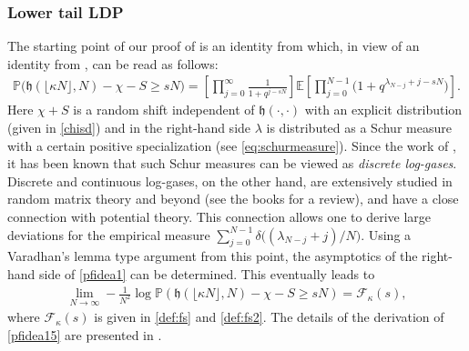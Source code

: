 \documentclass[reqno,11pt]{amsart}
\newcommand{\h}{\mathfrak{h}}
\renewcommand{\Pr}{\mathbb{P}}
\numberwithin{equation}{section}
\theoremstyle{definition}
\begin{document}
\subsubsection{Lower tail LDP} The starting point of our proof of  is an identity from \cite{borodin2016stochastic_MM,BO2016_ASEP} {which, in view of an identity from \cite{IMS_matching}}, can be read as follows:
\begin{align}\label{pfidea1}
    \Pr\big(\mathfrak{h}(\lfloor\kappa N\rfloor,N)-\chi-S \ge sN\big) = \left[\prod_{j=0}^\infty \frac{1}{1+q^{j-sN}}\right]\mathbb{E}\left[\prod_{j=0}^{N-1}\Big(1+q^{\lambda_{N-j}+j-sN}\Big)\right].
\end{align}
Here $\chi+S$ is a random shift independent of $\mathfrak{h}(\cdot,\cdot)$ with an explicit distribution (given in \eqref{chisd}) and in the right-hand side  $\lambda$ is distributed as a Schur measure with a certain positive specialization (see \eqref{eq:schurmeasure}). Since the work of \cite{johansson2000shape}, it has been known that such Schur measures can be viewed as \textit{discrete log-gases}.  Discrete and continuous log-gases, on the other hand, are extensively studied in random matrix theory and beyond (see the books \cite{AndersonGuionnetZeitouniBook,deift2000orthogonal,Forrester-LogGas,mehta2004random,pastur2011eigenvalue} for a review), and have a close connection with potential theory. This connection allows one to derive large deviations for the empirical measure $\sum_{j=0}^{N-1} \delta\big((\lambda_{N-j}+j)/N\big)$. Using a Varadhan's lemma type argument from this point,  the asymptotics of the right-hand side of \eqref{pfidea1} can be determined. This eventually leads to
 \begin{align}\label{pfidea15}
        \lim_{N\to \infty}-\frac1{N^2}\log\Pr(\h(\lfloor \kappa N \rfloor,N)-\chi-S \ge sN) = \mathcal{F}_\kappa(s),
    \end{align}
where $\mathcal{F}_\kappa(s)$ is given in \eqref{def:fs} and \eqref{def:fs2}. The details of the derivation of \eqref{pfidea15} are presented in . 

\medskip
\end{document}
